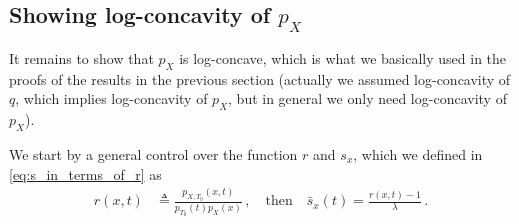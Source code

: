 \subsection{Showing log-concavity of $p_X$}
It remains to show that $p_X$ is log-concave, which is what we basically used in the proofs of the results in the previous section (actually we assumed log-concavity of $q$, which implies log-concavity of $p_X$, but in general we only need log-concavity of $p_X$).

We start by a general control over the function $r$ and $s_x$, which we defined in \cref{eq:s_in_terms_of_r} as
\begin{align}
    r(x, t) & \triangleq  \frac{p_{X, T_0}(x, t)}{p_{T_0}(t) p_X(x)}\,, \quad\text{then}\quad
    \bar{s}_x(t) = \frac{r(x, t) - 1}{\lambda}\,.
\end{align}

